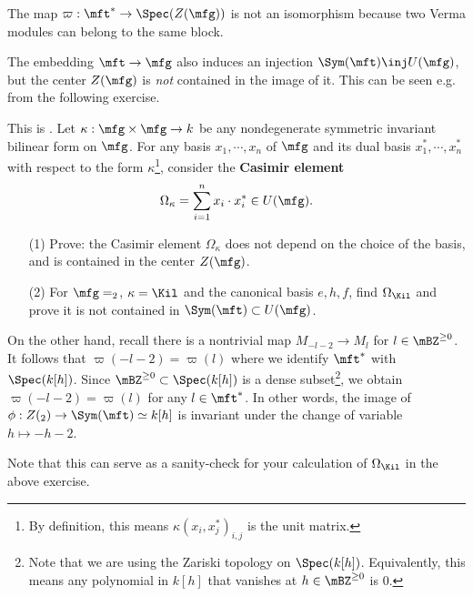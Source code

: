 \begin{rem}
	The map $\varpi: \mft^* \to \Spec(Z(\mfg))$ is not an isomorphism because two Verma modules can belong to the same block.
\end{rem}

\begin{warn}
	The embedding $\mft\to \mfg$ also induces an injection $\Sym(\mft) \inj U(\mfg)$, but the center $Z(\mfg)$ is \emph{not} contained in the image of it. This can be seen e.g. from the following exercise.
\end{warn}

\begin{exe}
	This is . Let $\kappa:\mfg\times\mfg \to k$ be any nondegenerate symmetric invariant bilinear form on $\mfg$. For any basis $x_1,\cdots,x_n$ of $\mfg$ and its dual basis $x_1^*,\cdots,x_n^*$ with respect to the form $\kappa$\footnote{By definition, this means $\kappa(x_i,x_j^*)_{i,j}$ is the unit matrix.}, consider the \textbf{Casimir element}
	\[
		\Omega_\kappa = \sum_{i=1}^n x_i \cdot x_i^* \in U(\mfg).
	\]
	\begin{itemize}
		\item[(1)]
			Prove: the Casimir element $\Omega_\kappa$ does not depend on the choice of the basis, and is contained in the center $Z(\mfg)$.
		\item[(2)]
			For $\mfg=\sl_2$, $\kappa=\Kil$ and the canonical basis $e,h,f$, find $\Omega_\Kil$ and prove it is not contained in $\Sym(\mft) \subset U(\mfg)$.
	\end{itemize}
\end{exe}

\begin{exam}
	\label{exam-rho-shift}
	On the other hand, recall there is a nontrivial map $M_{-l-2} \to M_l$ for $l\in \mBZ^{\ge 0}$. It follows that $\varpi(-l-2)=\varpi(l)$ where we identify $\mft^*$ with $\Spec(k[h])$. Since $ \mBZ^{\ge 0} \subset \Spec(k[h])$ is a dense subset\footnote{Note that we are using the Zariski topology on $\Spec(k[h])$. Equivalently, this means any polynomial in $k[h]$ that vanishes at $h\in \mBZ^{\ge 0}$ is $0$.}, we obtain $\varpi(-l-2)=\varpi(l)$ for any $l\in \mft^*$. In other words, the image of $\phi:Z(\sl_2) \to \Sym(\mft)\simeq k[h]$ is invariant under the change of variable $h\mapsto -h-2$.

	Note that this can serve as a sanity-check for your calculation of $\Omega_\Kil$ in the above exercise.
\end{exam}

